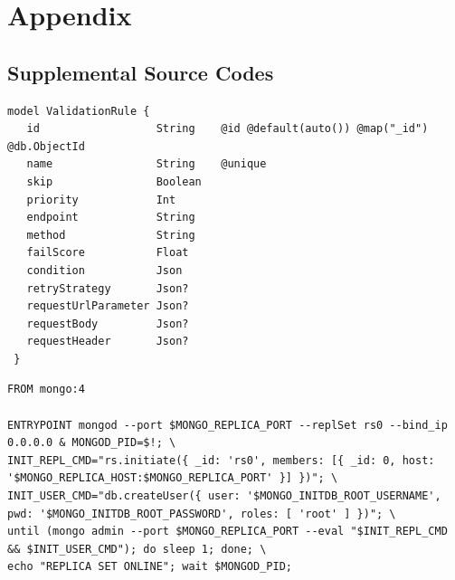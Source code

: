\appendix
{}

\chapter{Appendix}

 \section{Supplemental Source Codes}
 
  \begin{lstlisting}[caption={\emph{Prisma} schema of a validation rule (Prisma)}, label={code:prisma}]
 model ValidationRule {
   id                  String    @id @default(auto()) @map("_id") @db.ObjectId
   name                String    @unique
   skip                Boolean
   priority            Int
   endpoint            String
   method              String
   failScore           Float
   condition           Json
   retryStrategy       Json?
   requestUrlParameter Json?
   requestBody         Json?
   requestHeader       Json?
 }
  \end{lstlisting}

  \begin{lstlisting}[caption={Dockerfile to run MongoDB as a replication set locally. Taken from Prisma GitHub repository (Docker)}, label={code:mongo}, language=docker]
FROM mongo:4

ENTRYPOINT mongod --port $MONGO_REPLICA_PORT --replSet rs0 --bind_ip 0.0.0.0 & MONGOD_PID=$!; \
INIT_REPL_CMD="rs.initiate({ _id: 'rs0', members: [{ _id: 0, host: '$MONGO_REPLICA_HOST:$MONGO_REPLICA_PORT' }] })"; \
INIT_USER_CMD="db.createUser({ user: '$MONGO_INITDB_ROOT_USERNAME', pwd: '$MONGO_INITDB_ROOT_PASSWORD', roles: [ 'root' ] })"; \
until (mongo admin --port $MONGO_REPLICA_PORT --eval "$INIT_REPL_CMD && $INIT_USER_CMD"); do sleep 1; done; \
echo "REPLICA SET ONLINE"; wait $MONGOD_PID;
  \end{lstlisting}
 
